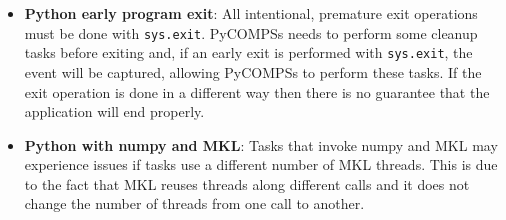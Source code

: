 \begin{itemize}
\item \textbf{Python early program exit}:\newline
All intentional, premature exit operations must be done with \verb|sys.exit|. PyCOMPSs needs to perform some cleanup tasks before exiting and, if an early exit is performed with \verb|sys.exit|, the event will be captured,
allowing PyCOMPSs to perform these tasks. If the exit operation is done in a different way then there is no guarantee that the application will end properly.

\item \textbf{Python with numpy and MKL}:\newline
Tasks that invoke numpy and MKL may experience issues if tasks use a different number of MKL threads. This is due to the fact that MKL reuses 
threads along different calls and it does not change the number of threads from one call to another.


\end{itemize}

